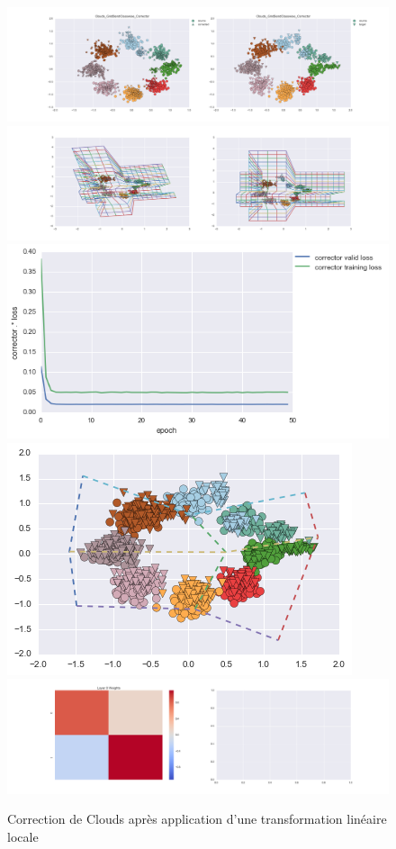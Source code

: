 \begin{figure}[H] %
\centering
\includegraphics[width=\linewidth]{fig/24-05-2016/clouds/Clouds_GridBendClasswise_Corrector-DATA.png}
\includegraphics[width=\linewidth]{fig/24-05-2016/clouds/Clouds_GridBendClasswise_Corrector-GridCheck.png}
\includegraphics[width=0.45\linewidth]{fig/24-05-2016/clouds/Clouds_GridBendClasswise_Corrector-Learning_curve.png}
\includegraphics[width=0.45\linewidth]{fig/24-05-2016/clouds/cloud_grid.png}
\includegraphics[width=\linewidth]{fig/24-05-2016/clouds/Clouds_GridBendClasswise_Corrector-W.png}
\caption{Correction de Clouds après application d'une transformation linéaire locale}
\label{fig:recap-clouds-GridBend-classwise}
\end{figure}

